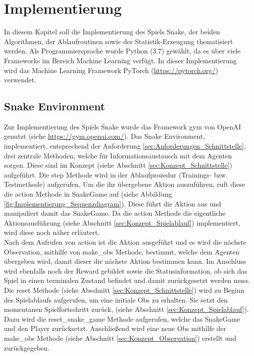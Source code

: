 \chapter{Implementierung} \label{chap:Implementierung}
In diesem Kapitel soll die Implementierung des Spiels Snake, der beiden Algorithmen, der Ablaufroutinen sowie der Statistik-Erzeugung thematisiert werden. Als Programmiersprache wurde Python (3.7) gewählt, da es über viele Frameworks im Bereich Machine Learning verfügt.
In dieser Implementierung wird das Machine Learning Framework PyTorch (\url{https://pytorch.org/}) verwendet.

\section{Snake Environment} \label{sec:Implementierung_Environment}
Zur Implementierung des Spiels Snake wurde das Framework gym von OpenAI genutzt (siehe \url{https://gym.openai.com/}). Das Snake Environment, implementiert, entsprechend der Anforderung \ref{sec:Anforderungen_Schnittstelle}, drei zentrale Methoden, welche für Informationsaustausch mit dem Agenten sorgen. Diese sind im Konzept (siehe Abschnitt \ref{sec:Konzept_Schnittstelle}) aufgeführt. 
Die step Methode wird in der Ablaufprozedur (Trainings- bzw. Testmethode) aufgerufen. Um die ihr übergebene Aktion auszuführen, ruft diese die action Methode in SnakeGame auf (siehe Abbildung \ref{fig:Implementierung_Sequenzdiagram}). Diese führt die Aktion aus und manipuliert damit das SnakeGame. Da die action Methode die eigentliche Aktionsausführung (siehe Abschnitt \ref{sec:Konzept_Spielablauf}) implementiert, wird diese noch näher erläutert.\\
Nach dem Aufrufen von action ist die Aktion ausgeführt und es wird die nächste Observation, mithilfe von make\_obs Methode, bestimmt, welche dem Agenten übergeben wird, damit dieser die nächste Aktion bestimmen kann. Im Anschluss wird ebenfalls noch der Reward gebildet sowie die Statusinformation, ob sich das Spiel in einen terminalen Zustand befindet und damit zurückgesetzt werden muss.\\
Die reset Methode (siehe Abschnitt \ref{sec:Konzept_Schnittstelle}) wird zu Beginn des Spielablaufs aufgerufen, um eine initiale Obs zu erhalten. Sie setzt den momentanen Spielfortschritt zurück, (siehe Abschnitt \ref{sec:Konzept_Spielablauf}). Dazu wird die reset\_snake\_game Methode aufgerufen, welche das SnakeGame und den Player zurücksetzt. Anschließend wird eine neue Obs mithilfe der make\_obs Methode (siehe Abschnitt \ref{sec:Konzept_Observation}) erstellt und zurückgegeben.\\
